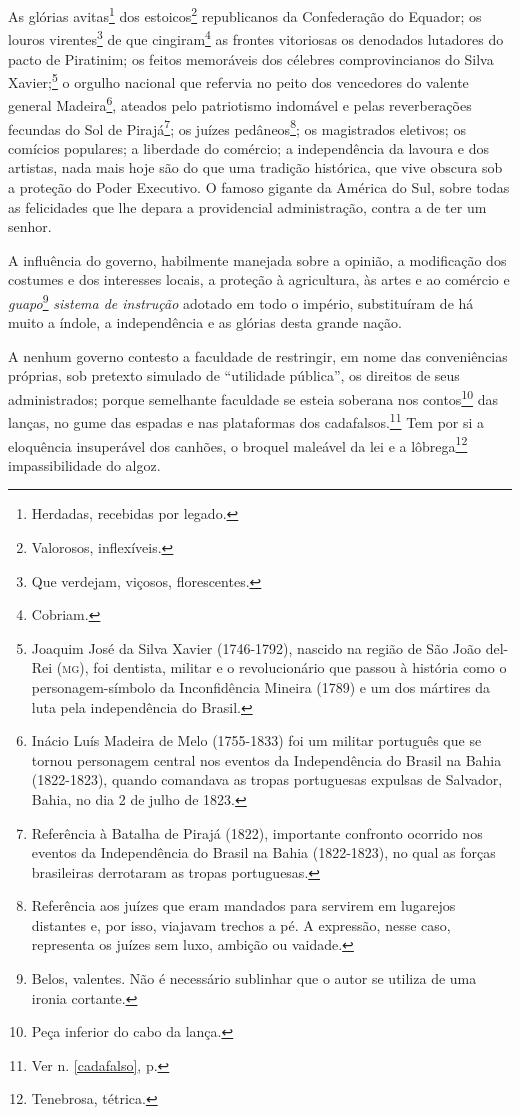 As glórias avitas\footnote{Herdadas, recebidas por legado.} dos
estoicos\footnote{Valorosos, inflexíveis.} republicanos da
Confederação do Equador; os louros virentes\footnote{Que verdejam,
  viçosos, florescentes.} de que cingiram\footnote{Cobriam.} as
frontes vitoriosas os denodados lutadores do pacto de Piratinim; os
feitos memoráveis dos célebres comprovincianos do Silva
Xavier;\footnote{Joaquim José da Silva Xavier (1746-1792), nascido na
  região de São João del-Rei (\textsc{mg}), foi dentista, militar e o
  revolucionário que passou à história como o personagem-símbolo da
  Inconfidência Mineira (1789) e um dos mártires da luta pela
  independência do Brasil.} o orgulho nacional que refervia no peito
dos vencedores do valente general Madeira\footnote{Inácio Luís Madeira
  de Melo (1755-1833) foi um militar português que se tornou personagem
  central nos eventos da Independência do Brasil na Bahia (1822-1823),
  quando comandava as tropas portuguesas expulsas de Salvador, Bahia, no
  dia 2 de julho de 1823.}, ateados pelo patriotismo indomável e pelas
reverberações fecundas do Sol de Pirajá\footnote{Referência à Batalha de Pirajá 
(1822), importante confronto ocorrido nos eventos da
  Independência do Brasil na Bahia (1822-1823), no qual as forças
  brasileiras derrotaram as tropas portuguesas.}; os juízes
pedâneos\footnote{Referência aos juízes que eram mandados para
  servirem em lugarejos distantes e, por isso, viajavam trechos a pé. A
  expressão, nesse caso, representa os juízes sem luxo, ambição ou
  vaidade.}; os magistrados eletivos; os comícios populares; a liberdade
do comércio; a independência da lavoura e dos artistas, nada mais hoje
são do que uma tradição histórica, que vive obscura sob a proteção do
Poder Executivo. O famoso gigante da América do Sul, sobre todas as
felicidades que lhe depara a providencial administração, contra a de ter
um senhor.

A influência do governo, habilmente manejada sobre a opinião, a
modificação dos costumes e dos interesses locais, a proteção à
agricultura, às artes e ao comércio e \emph{guapo}\footnote{Belos,
  valentes. Não é necessário sublinhar que o autor se utiliza de uma
  ironia cortante.} \emph{sistema de instrução} adotado em todo o
império, substituíram de há muito a índole, a independência e as glórias
desta grande nação.

A nenhum governo contesto a faculdade de restringir, em nome das
conveniências próprias, sob pretexto simulado de ``utilidade pública'', os
direitos de seus administrados; porque semelhante faculdade se esteia
soberana nos contos\footnote{Peça inferior do cabo da lança.} das
lanças, no gume das espadas e nas plataformas dos cadafalsos.\footnote{Ver n. \ref{cadafalso}, 
p. \pageref{cadafalso}} Tem por si a eloquência insuperável dos canhões, 
o broquel maleável da lei e a lôbrega\footnote{Tenebrosa, tétrica.} impassibilidade do
algoz.

